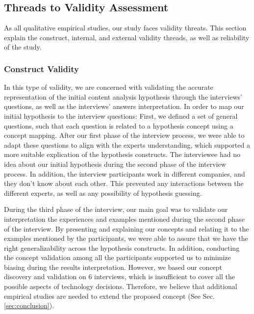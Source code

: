 \documentclass[conference]{IEEEtran}
\begin{document}
\subsection{Threads to Validity Assessment}
As all qualitative empirical studies, our study faces validity threats. This
section explain the construct, internal, and external validity threads, as well
as reliability of the study.
\subsubsection{Construct Validity}
In this type of validity, we are concerned with validating the accurate
representation of the initial content analysis hypothesis through the
interviews' questions, as well as the interviews' answers interpretation. In
order to map our initial hypothesis to the interview questions: First, we defined a set of
general questions, such that each question is related to a hypothesis concept
using a concept mapping. After our first phase of the interview process, we were
able to adapt these questions to align with the experts understanding, which
supported a more suitable explication of the hypothesis constructs. The
interviewee had no idea about our initial hypothesis during the second phase of
the interview process. In addition, the interview participants work in different
companies, and they don't know about each other. This prevented any interactions
between the different experts, as well as any possibility of hypothesis
guessing.

During the third phase of the interview, our main goal was to validate our
interpretation the experiences and examples mentioned during the second phase
of the interview. By presenting and explaining our concepts and relating it to
the examples mentioned by the participants, we were able to assure that we have
the right generalizability across the hypothesis constructs. In addition,
conducting the concept validation among all the participants supported us to
minimize biasing during the results interpretation. However, we based our
concept discovery and validation on 6 interviews, which is insufficient to cover
all the possible aspects of technology decisions. Therefore, we believe that
additional empirical studies are needed to extend the proposed concept (See Sec.
\ref{sec:conclusion}).
\end{document}
